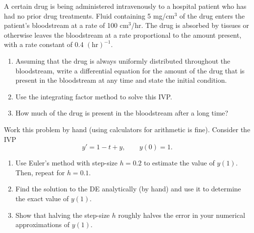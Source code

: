 \documentclass[12pt,letterpaper]{hmcpset}
\begin{document}

\begin{problem}[1]
A certain drug is being administered intravenously
  to a hospital patient who has had no prior drug treatments.  Fluid containing 5 mg/cm$^3$ of the drug
  enters the patient's bloodstream at a rate of 100 cm$^3$/hr. The
  drug is absorbed by tissues or otherwise leaves the bloodstream at a
  rate proportional to the amount present, with a rate constant of 0.4
  $(\mbox{hr})^{-1}$.
\begin{enumerate}
\item Assuming that the drug is always uniformly distributed
  throughout the bloodstream, write a differential equation for the
  amount of the drug that is present in the bloodstream at any time and state the initial condition.
\item Use the integrating factor method to solve this IVP.
\item How much of the drug is present in the bloodstream after a long
  time?
\end{enumerate}
\end{problem}

\begin{solution}
  \vfill
\end{solution}
\newpage

\begin{problem}[2]
Work this problem by hand (using calculators for arithmetic is fine).  Consider the IVP
$$y' =1-t+y, \qquad y(0)=1.$$	
\begin{enumerate}
	\item Use Euler's method with step-size $h=0.2$ to estimate the value of $y(1)$. Then, repeat for $h=0.1$. 
	\item Find the solution to the DE analytically (by hand) and use it to determine the exact value of $y(1)$.
	\item Show that halving the step-size $h$ roughly halves the error in your numerical approximations of $y(1)$.
\end{enumerate}
\end{problem}

\begin{solution}
  \vfill
\end{solution}
\newpage
\end{document}
